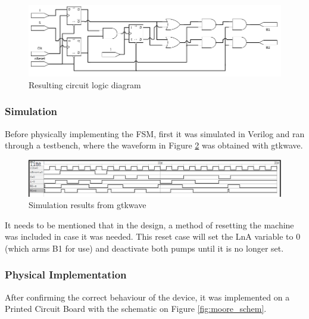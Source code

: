 \begin{figure}[H]
    \begin{center}
        \includegraphics[width=\linewidth]{../Exercise1/Moore/report/circuit.png}
        \caption{Resulting circuit logic diagram}
        \label{fig:moore_circuit}
    \end{center}
\end{figure}

\subsubsection{\color{orange}Simulation}

Before physically implementing the FSM, first it was simulated in Verilog and ran through a testbench, 
where the waveform in Figure \ref{fig:moore_gtk} was obtained with gtkwave.

\begin{figure}[H]
    \begin{center}
        \includegraphics[width=\linewidth]{../Exercise1/Moore/report/gtkwave.png}
        \caption{Simulation results from gtkwave}
        \label{fig:moore_gtk}
    \end{center}
\end{figure}

It needs to be mentioned that in the design, a method of resetting the machine was included in case it was needed.
This reset case will set the LnA variable to 0 (which arms B1 for use) and deactivate both pumps until it is no longer
set.

\subsubsection{\color{orange}Physical Implementation}

After confirming the correct behaviour of the device, it was implemented on a Printed Circuit Board with the schematic
on Figure \ref{fig:moore_schem}.

